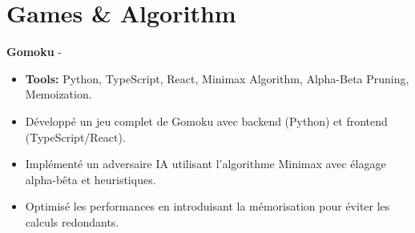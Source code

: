 \documentclass[a4paper,11pt]{article}%
\begin{document}
\section*{Games \& Algorithm}%
%
\noindent \textbf{Gomoku} - \href{https://github.com/sboof911/Gomoku}{{}}%
\begin{itemize}[leftmargin=2em,parsep=0pt,topsep=1em]%
\item[] \textbf{Tools:} Python, TypeScript, React, Minimax Algorithm, Alpha-Beta Pruning, Memoization.%
\item D\'evelopp\'e un jeu complet de Gomoku avec backend (Python) et frontend (TypeScript/React).%
\item Impl\'ement\'e un adversaire IA utilisant l'algorithme Minimax avec \'elagage alpha-b\^eta et heuristiques.%
\item Optimis\'e les performances en introduisant la m\'emorisation pour \'eviter les calculs redondants.%
\end{itemize}%
%
\end{document}
